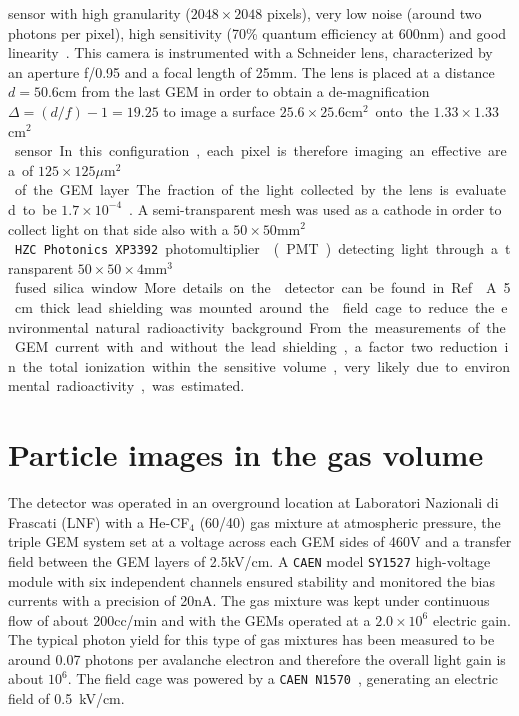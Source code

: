 \documentclass[12pt]{iopart}
\begin{document}
sensor with high granularity ($2048{\times}2048$ pixels), very low
noise (around two photons per pixel), high sensitivity (70\% quantum
efficiency at 600\unit{nm}) and good
linearity~\cite{bib:jinst_orange1}. This camera is instrumented with a
Schneider lens, characterized by an aperture f/0.95 and a focal length
of 25\unit{mm}. The lens is placed at a distance $d=50.6$\unit{cm}
from the last GEM in order to obtain a de-magnification $\Delta =
(d/f) - 1 = 19.25$ to image a surface $25.6{\times}25.6$\unit{cm$^2$}
onto the $1.33{\times}1.33$\unit{cm$^2$} sensor.  In this
configuration, each pixel is therefore imaging an effective area of
$125{\times}125$\unit{$\mu$m$^2$} of the GEM layer. The fraction of
the light collected by the lens is evaluated
to be $1.7{\times}10^{-4}$~\cite{bib:jinst_orange1}.
%
A semi-transparent mesh was used as a cathode in order to collect
light on that side also with a $50{\times}50$\unit{mm$^2$}
\texttt{HZC~Photonics~XP3392} photomultiplier~\cite{PMTPhotonics}
(PMT) detecting light through a transparent
$50{\times}50{\times}4$\unit{mm$^3$} fused silica window. More details
on the \lemon detector can be found in Ref.~\cite{paperBTF}.

A 5\unit{cm} thick lead shielding was mounted around the \lemon field
cage to reduce the environmental natural radioactivity
background. From the measurements of the GEM current with and without
the lead shielding, a factor two reduction in the total ionization
within the sensitive volume, very likely due to environmental
radioactivity, was estimated.


\section{Particle images in the \lemon gas volume}

The \lemon detector was operated in an overground location at
Laboratori Nazionali di Frascati (LNF) with a He-CF$_4$ (60/40) gas
mixture at atmospheric pressure, the triple GEM system set at a
voltage across each GEM sides of 460\unit{V} and a transfer field
between the GEM layers of 2.5\unit{kV/cm}.  A \texttt{CAEN} model
\texttt {SY1527} high-voltage module with six independent channels
ensured stability and monitored the bias currents with a precision of
20\unit{nA}. The gas mixture was kept under continuous flow of about
200\unit{cc/min} and with the GEMs operated at a $2.0\times10^6$
electric gain. The typical photon yield for this type of gas mixtures
has been measured to be around 0.07 photons per avalanche
electron\cite{bib:jinst_orange1, bib:roby, bib:tesinatalia} and
therefore the overall light gain is about $10^6$. The field cage was
powered by a \texttt{CAEN~N1570}~\cite{CAENN1570}, generating an
electric field of 0.5~kV/cm.
  
\end{document}
